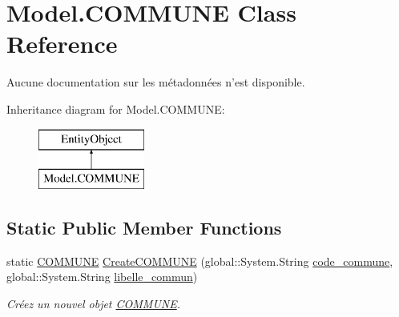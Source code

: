 \hypertarget{class_model_1_1_c_o_m_m_u_n_e}{\section{Model.\-C\-O\-M\-M\-U\-N\-E Class Reference}
\label{class_model_1_1_c_o_m_m_u_n_e}
}


Aucune documentation sur les métadonnées n'est disponible.  


Inheritance diagram for Model.\-C\-O\-M\-M\-U\-N\-E\-:\begin{figure}[H]
\begin{center}
\leavevmode
\includegraphics[height=2.000000cm]{class_model_1_1_c_o_m_m_u_n_e}
\end{center}
\end{figure}
\subsection*{Static Public Member Functions}
\begin{DoxyCompactItemize}
\item 
static \hyperlink{class_model_1_1_c_o_m_m_u_n_e}{C\-O\-M\-M\-U\-N\-E} \hyperlink{class_model_1_1_c_o_m_m_u_n_e_a4462879810e735f36043e31fa7ae4dda}{Create\-C\-O\-M\-M\-U\-N\-E} (global\-::\-System.\-String \hyperlink{class_model_1_1_c_o_m_m_u_n_e_aee3168256be0d999cdc2a6db66875cf9}{code\-\_\-commune}, global\-::\-System.\-String \hyperlink{class_model_1_1_c_o_m_m_u_n_e_a7e5b6345cd53c93bc68aadbf0846038d}{libelle\-\_\-commun})
\begin{DoxyCompactList}\small\item\em Créez un nouvel objet \hyperlink{class_model_1_1_c_o_m_m_u_n_e}{C\-O\-M\-M\-U\-N\-E}. \end{DoxyCompactList}\end{DoxyCompactItemize}
